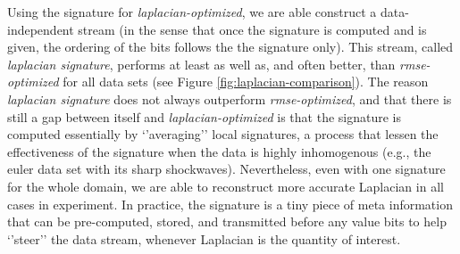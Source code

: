 Using the signature for \emph{laplacian-optimized}, we are able construct a data-independent stream
(in the sense that once the signature is computed and is given, the ordering of the bits follows the
the signature only). This stream, called \emph{laplacian signature}, performs at least as well as,
and often better, than \emph{rmse-optimized} for all data sets (see Figure
\ref{fig:laplacian-comparison}). The reason \emph{laplacian signature} does not always outperform
\emph{rmse-optimized}, and that there is still a gap between itself and \emph{laplacian-optimized}
is that the signature is computed essentially by `'averaging'' local signatures, a process that
lessen the effectiveness of the signature when the data is highly inhomogenous (e.g., the euler data
set with its sharp shockwaves). Nevertheless, even with one signature for the whole domain, we are
able to reconstruct more accurate Laplacian in all cases in experiment. In practice, the signature
is a tiny piece of meta information that can be pre-computed, stored, and transmitted before any
value bits to help `'steer'' the data stream, whenever Laplacian is the quantity of interest.
